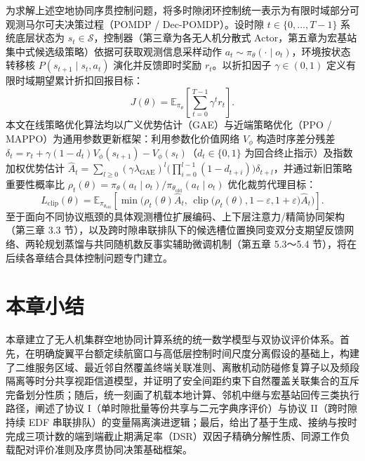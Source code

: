 为求解上述空地协同序贯控制问题，将多时隙闭环控制统一表示为有限时域部分可观测马尔可夫决策过程（POMDP / Dec-POMDP）\cite{sutton2018reinforcement,littman1994markov}。设时隙 $t\in\{0,\ldots,T-1\}$ 系统底层状态为 $s_t\in\mathcal{S}$，控制器（第三章为各无人机分散式 Actor，第五章为宏基站集中式候选级策略）依据可获取观测信息采样动作 $a_t\sim\pi_\theta(\cdot\mid o_t)$，环境按状态转移核 $P(s_{t+1}\mid s_t,a_t)$ 演化并反馈即时奖励 $r_t$。以折扣因子 $\gamma\in(0,1)$ 定义有限时域期望累计折扣回报目标：
\begin{equation}
    J(\theta)=\mathbb{E}_{\pi_\theta}\left[\sum_{t=0}^{T-1}\gamma^t r_t\right].
    \label{eq:ch2-return}
\end{equation}
本文在线策略优化算法均以广义优势估计（GAE）\cite{schulman2015high}与近端策略优化（PPO / MAPPO）\cite{schulman2017proximal,yu2022surprising}为通用参数更新框架：利用参数化价值网络 $V_\phi$ 构造时序差分残差 $\delta_t=r_t+\gamma(1-d_t)V_\phi(s_{t+1})-V_\phi(s_t)$（$d_t\in\{0,1\}$ 为回合终止指示）及指数加权优势估计 $\widehat{A}_t=\sum_{l\ge 0}(\gamma\lambda_{\mathrm{GAE}})^l\big(\prod_{i=0}^{l-1}(1-d_{t+i})\big)\delta_{t+l}$，并通过新旧策略重要性概率比 $\rho_t(\theta)=\pi_\theta(a_t\mid o_t)/\pi_{\theta_{\mathrm{old}}}(a_t\mid o_t)$ 优化裁剪代理目标：
\begin{equation}
    L_{\mathrm{clip}}(\theta)=\mathbb{E}_{\pi_{\theta_{\mathrm{old}}}}\left[
       \min\Big(\rho_t(\theta)\widehat{A}_t,\,
       \operatorname{clip}\big(\rho_t(\theta),1-\varepsilon,1+\varepsilon\big)\widehat{A}_t\Big)\right].
    \label{eq:ch2-ppo-clip}
\end{equation}
至于面向不同协议瓶颈的具体观测槽位扩展编码、上下层注意力/精简协同架构（第三章 3.3 节），以及跨时隙串联排队下的候选槽位置换同变双分支期望反馈网络、两轮规划蒸馏与共同随机数反事实辅助微调机制（第五章 5.3～5.4 节），将在后续各章结合具体控制问题专门建立。

\section{本章小结}
\label{sec:summary-chap02}

本章建立了无人机集群空地协同计算系统的统一数学模型与双协议评价体系。首先，在明确旋翼平台额定续航窗口与高低层控制时间尺度分离假设的基础上，构建了二维服务区域、最近邻自然覆盖终端关联准则、离散机动防碰修复算子以及频段隔离等时分共享视距信道模型，并证明了安全间距约束下自然覆盖关联集合的互斥完备划分性质；随后，统一刻画了机载本地计算、邻机中继与宏基站回传三类执行路径，阐述了协议 I（单时隙批量等份共享与二元字典序评价）与协议 II（跨时隙持续 EDF 串联排队）的变量隔离演进逻辑；最后，给出了基于生成、接纳与按时完成三项计数的端到端截止期满足率（DSR）双因子精确分解性质、同源工作负载配对评价准则及序贯协同决策基础框架。
